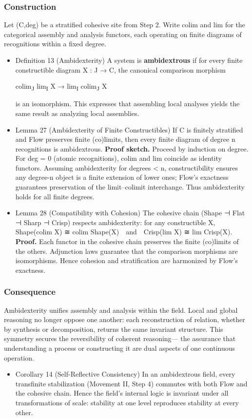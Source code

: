 \documentclass[11pt]{article}
\begin{document}
\subsubsection*{Construction}
\label{sec:org88b99ac}
Let (C,deg) be a stratified cohesive site from Step 2.  
Write colim and lim for the categorical assembly and analysis functors,  
each operating on finite diagrams of recognitions within a fixed degree.
\begin{itemize}
\item Definition 13 (Ambidexterity)
\label{sec:org4d6f759}
A system is \textbf{ambidextrous} if for every finite constructible diagram X : J → C,  
the canonical comparison morphism

colim\textsubscript{J} lim\textsubscript{I} X  →  lim\textsubscript{I} colim\textsubscript{J} X

is an isomorphism.  
This expresses that assembling local analyses yields the same result  
as analyzing local assemblies.
\item Lemma 27 (Ambidexterity of Finite Constructibles)
\label{sec:orgc1836e5}
If C is finitely stratified and Flow preserves finite (co)limits,  
then every finite diagram of degree n recognitions is ambidextrous.  
\textbf{Proof sketch.}  
Proceed by induction on degree.  
For deg = 0 (atomic recognitions), colim and lim coincide as identity functors.  
Assuming ambidexterity for degrees < n,  
constructibility ensures any degree-n object is a finite extension of lower ones;  
Flow’s exactness guarantees preservation of the limit–colimit interchange.  
Thus ambidexterity holds for all finite degrees.
\item Lemma 28 (Compatibility with Cohesion)
\label{sec:org03b6ff2}
The cohesive chain (Shape ⊣ Flat ⊣ Sharp ⊣ Crisp) respects ambidexterity:  
for any constructible X,
Shape(colim X) ≅ colim Shape(X) and Crisp(lim X) ≅ lim Crisp(X).  
\textbf{Proof.}  
Each functor in the cohesive chain preserves the finite (co)limits of the others.  
Adjunction laws guarantee that the comparison morphisms are isomorphisms.  
Hence cohesion and stratification are harmonized by Flow’s exactness.
\end{itemize}
\subsubsection*{Consequence}
\label{sec:org5337205}
Ambidexterity unifies assembly and analysis within the field.  
Local and global reasoning no longer oppose one another:  
each reconstruction of relation, whether by synthesis or decomposition,  
returns the same invariant structure.  
This symmetry secures the reversibility of coherent reasoning—  
the assurance that understanding a process or constructing it  
are dual aspects of one continuous operation.
\begin{itemize}
\item Corollary 14 (Self-Reflective Consistency)
\label{sec:org5e73e18}
In an ambidextrous field, every transfinite stabilization (Movement II, Step 4)  
commutes with both Flow and the cohesive chain.  
Hence the field’s internal logic is invariant under all transformations of scale:  
stability at one level reproduces stability at every other.
\end{itemize}
\end{document}
